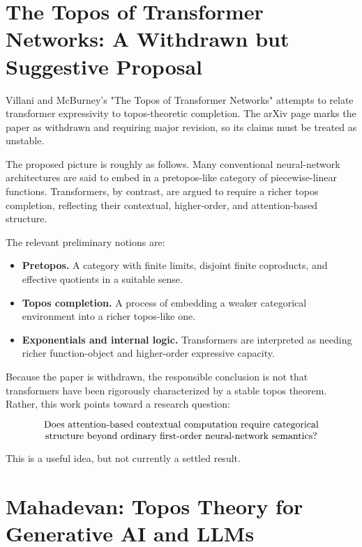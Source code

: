 \documentclass[11pt]{article}
\begin{document}
\section{The Topos of Transformer Networks: A Withdrawn but Suggestive Proposal}

Villani and McBurney's "The Topos of Transformer Networks" attempts to relate transformer expressivity to topos-theoretic completion. The arXiv page marks the paper as withdrawn and requiring major revision, so its claims must be treated as unstable.


The proposed picture is roughly as follows. Many conventional neural-network architectures are said to embed in a pretopos-like category of piecewise-linear functions. Transformers, by contrast, are argued to require a richer topos completion, reflecting their contextual, higher-order, and attention-based structure.


The relevant preliminary notions are:


\begin{itemize}
\item \textbf{Pretopos.} A category with finite limits, disjoint finite coproducts, and
effective quotients in a suitable sense.

\item \textbf{Topos completion.} A process of embedding a weaker categorical environment
into a richer topos-like one.

\item \textbf{Exponentials and internal logic.} Transformers are interpreted as needing
richer function-object and higher-order expressive capacity.

\end{itemize}

Because the paper is withdrawn, the responsible conclusion is not that transformers have been rigorously characterized by a stable topos theorem. Rather, this work points toward a research question:


\[
\parbox{0.86\textwidth}{\centering
Does attention-based contextual computation require categorical
structure beyond ordinary first-order neural-network semantics?}
\]

This is a useful idea, but not currently a settled result.


\section{Mahadevan: Topos Theory for Generative AI and LLMs}
\end{document}
